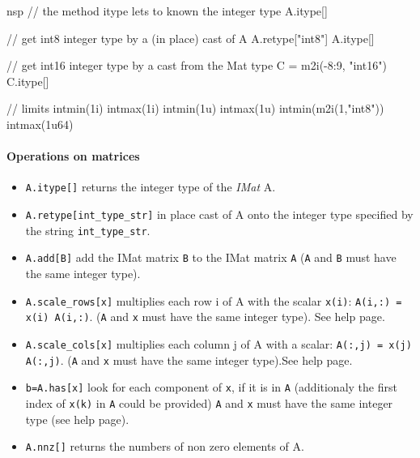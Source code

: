 \begin{mandescription}
\begin{mintednsp}{nsp}
// the method itype lets to known the integer type
A.itype[]

// get int8 integer type by a (in place) cast of A
A.retype["int8"]
A.itype[]

// get int16 integer type by a cast from the Mat type
C = m2i(-8:9, "int16")
C.itype[]

// limits
intmin(1i)
intmax(1i)
intmin(1u)
intmax(1u)
intmin(m2i(1,"int8"))
intmax(1u64)
\end{mintednsp}


\end{mandescription}

\paragraph{Operations on matrices}


\begin{itemize}
\item \verb+A.itype[]+ returns the integer type of the \emph{IMat} A.
\item \verb+A.retype[int_type_str]+ in place cast of A onto the integer type specified by the string \verb+int_type_str+.
\item \verb+A.add[B]+  add the IMat matrix \verb+B+ to the IMat matrix \verb+A+ (\verb+A+ and \verb+B+ must have
the same  integer type).
\item \verb+A.scale_rows[x]+ multiplies each row i of A with the scalar \verb+x(i)+:
  \verb+A(i,:) = x(i) A(i,:)+.  (\verb+A+ and \verb+x+ must have the same integer type). See  help page.
\item \verb+A.scale_cols[x]+ multiplies each column j of A with a scalar:
  \verb+A(:,j) = x(j) A(:,j)+. (\verb+A+ and \verb+x+ must have the same  integer type).See  help page.
\item \verb+b=A.has[x]+ look for each component of \verb+x+, 
  if it is in \verb+A+ (additionaly the first index of \verb+x(k)+ in \verb+A+ could be provided)
  \verb+A+ and \verb+x+ must have the same  integer type (see  help page).
\item \verb+A.nnz[]+ returns the numbers of non zero elements of A.
\end{itemize}

